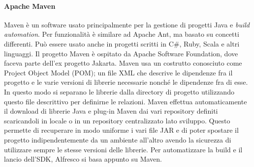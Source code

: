 \paragraph{Apache Maven}
 Maven è un software usato principalmente per la gestione di progetti Java e \emph{build automation}. Per funzionalità è similare ad Apache Ant, ma basato su concetti differenti. Può essere usato anche in progetti scritti in C\#, Ruby, Scala e altri linguaggi. Il progetto Maven è ospitato da Apache Software Foundation, dove faceva parte dell'ex progetto Jakarta.
Maven usa un costrutto conosciuto come Project Object Model (POM); un file XML che descrive le dipendenze fra il progetto e le varie versioni di librerie necessarie nonché le dipendenze fra di esse. In questo modo si separano le librerie dalla directory di progetto utilizzando questo file descrittivo per definirne le relazioni.
Maven effettua automaticamente il download di librerie Java e plug-in Maven dai vari repository definiti scaricandoli in locale o in un repository centralizzato lato sviluppo. Questo permette di recuperare in modo uniforme i vari file JAR e di poter spostare il progetto indipendentemente da un ambiente all'altro avendo la sicurezza di utilizzare sempre le stesse versioni delle librerie.
Per automatizzare la build e il lancio dell'SDK, Alfresco si basa appunto su Maven.

